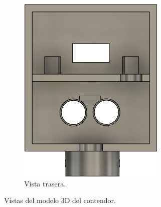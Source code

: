 \begin{figure}[bth]
\begin{subfigure}{.35\textwidth}
        \includegraphics[width=\textwidth
        ]{imgs/vistas-contenedor/trasera.png}
        \caption{Vista trasera.}
        \label{fig:contenedor-trasera}
    \end{subfigure}
    \caption{Vistas del modelo 3D del contendor.}
    \label{fig:contenedor-vistas}
\end{figure}

